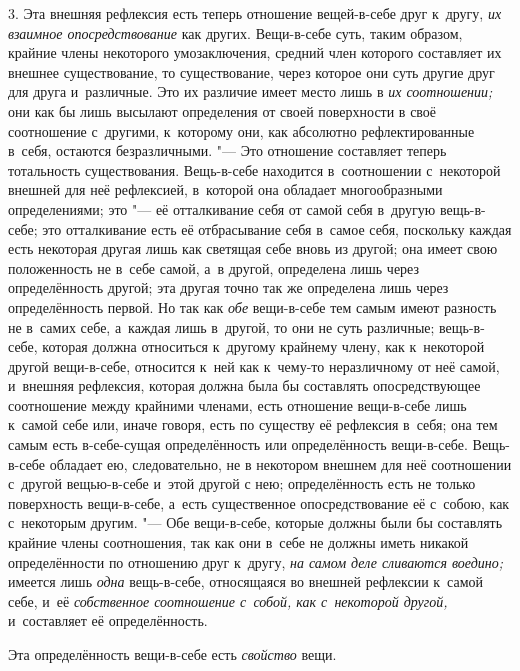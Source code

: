 3. Эта внешняя рефлексия есть теперь отношение вещей-в-себе друг к~другу,
{\em их взаимное опосредствование} как других.
Вещи-в-себе суть, таким образом, крайние члены некоторого умозаключения,
средний член которого составляет их внешнее существование, то
существование, через которое они суть другие друг для друга и~различные.
Это их различие имеет место лишь в {\em их соотношении;} они как бы
лишь высылают определения от своей поверхности в
своё соотношение с~другими, к~которому они, как абсолютно рефлектированные
в~себя, остаются безразличными. "--- Это отношение составляет теперь
тотальность существования. Вещь-в-себе находится в~соотношении с~некоторой
внешней для неё рефлексией, в~которой она обладает многообразными
определениями; это "--- её отталкивание себя от самой себя в~другую вещь-в-себе;
это отталкивание есть её отбрасывание себя в~самое себя, поскольку каждая
есть некоторая другая лишь как светящая себе вновь из другой; она имеет
свою положенность не в~себе самой, а~в другой, определена лишь через
определённость другой; эта другая точно так же определена лишь через
определённость первой. Но так как {\em обе} вещи-в-себе
тем самым имеют разность не в~самих себе, а~каждая лишь в~другой, то они не
суть различные; вещь-в-себе, которая должна относиться к~другому крайнему
члену, как к~некоторой другой вещи-в-себе, относится к~ней как к~чему-то
неразличному от неё самой, и~внешняя рефлексия, которая должна была бы
составлять опосредствующее соотношение между крайними членами, есть
отношение вещи-в-себе лишь к~самой себе или, иначе говоря, есть по существу
её рефлексия в~себя; она тем самым есть в-себе-сущая определённость или
определённость вещи-в-себе. Вещь-в-себе обладает ею, следовательно, не в
некотором внешнем для неё соотношении с~другой вещью-в-себе и~этой другой с
нею; определённость есть не только поверхность вещи-в-себе, а~есть
существенное опосредствование её с~собою, как с~некоторым другим. "--- Обе
вещи-в-себе, которые должны были бы составлять крайние члены соотношения,
так как они в~себе не должны иметь никакой определённости по отношению друг
к~другу, {\em на самом деле сливаются воедино;} имеется лишь {\em одна}
вещь-в-себе, относящаяся во внешней рефлексии к~самой себе, и~её
{\em собственное соотношение с~собой, как с~некоторой другой,}
и~составляет её определённость.

Эта определённость вещи-в-себе есть {\em свойство} вещи.



